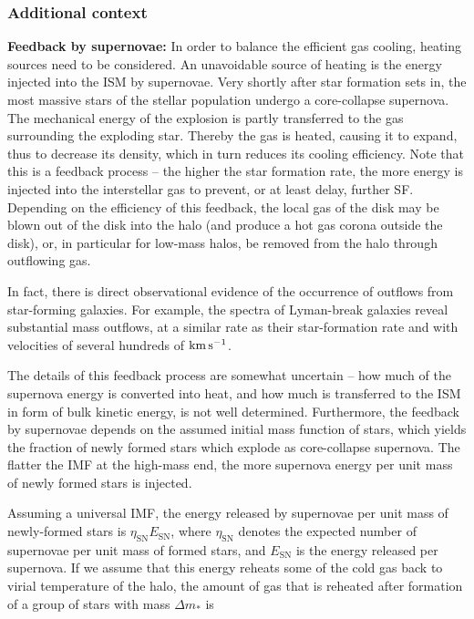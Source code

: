 \documentclass[a4paper,11pt]{article}
\begin{document}
\subsubsection{Additional context}

{\noindent}\textbf{Feedback by supernovae:} In order to balance the efficient gas cooling, heating sources need to be considered. An unavoidable source of heating is the energy injected into the ISM by supernovae. Very shortly after star formation sets in, the most massive stars of the stellar population undergo a core-collapse supernova. The mechanical energy of the explosion is partly transferred to the gas surrounding the exploding star. Thereby the gas is heated, causing it to expand, thus to decrease its density, which in turn reduces its cooling efficiency. Note that this is a feedback process -- the higher the star formation rate, the more energy is injected into the interstellar gas to prevent, or at least delay, further SF. Depending on the efficiency of this feedback, the local gas of the disk may be blown out of the disk into the halo (and produce a hot gas corona outside the disk), or, in particular for low-mass halos, be removed from the halo through outflowing gas.

{\noindent}In fact, there is direct observational evidence of the occurrence of outflows from star-forming galaxies. For example, the spectra of Lyman-break galaxies reveal substantial mass outflows, at a similar rate as their star-formation rate and with velocities of several hundreds of ${\rm km\,s^{-1}}$.

{\noindent}The details of this feedback process are somewhat uncertain -- how much of the supernova energy is converted into heat, and how much is transferred to the ISM in form of bulk kinetic energy, is not well determined. Furthermore, the feedback by supernovae depends on the assumed initial mass function of stars, which yields the fraction of newly formed stars which explode as core-collapse supernova. The flatter the IMF at the high-mass end, the more supernova energy per unit mass of newly formed stars is injected.

{\noindent}Assuming a universal IMF, the energy released by supernovae per unit mass of newly-formed stars is $\eta_\mathrm{SN}E_\mathrm{SN}$, where $\eta_\mathrm{SN}$ denotes the expected number of supernovae per unit mass of formed stars, and $E_\mathrm{SN}$ is the energy released per supernova. If we assume that this energy reheats some of the cold gas back to virial temperature of the halo, the amount of gas that is reheated after formation of a group of stars with mass $\Delta m_*$ is
\end{document}

